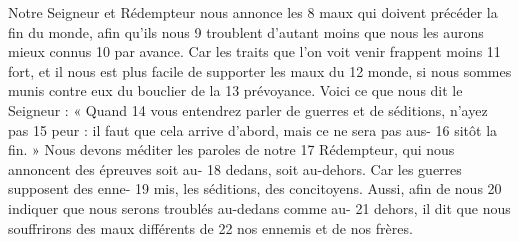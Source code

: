 Notre Seigneur et Rédempteur nous annonce les	 
8	 	maux qui doivent précéder la fin du monde, afin qu'ils nous	 
9	 	troublent d'autant moins que nous les aurons mieux connus	 
10	 	par avance. Car les traits que l'on voit venir frappent moins	 
11	 	fort, et il nous est plus facile de supporter les maux du	 
12	 	monde, si nous sommes munis contre eux du bouclier de la	 
13	 	prévoyance. Voici ce que nous dit le Seigneur : « Quand	 
14	 	vous entendrez parler de guerres et de séditions, n'ayez pas	 
15	 	peur : il faut que cela arrive d'abord, mais ce ne sera pas aus-	 
16	 	sitôt la fin. » Nous devons méditer les paroles de notre	 
17	 	Rédempteur, qui nous annoncent des épreuves soit au-	 
18	 	dedans, soit au-dehors. Car les guerres supposent des enne-	 
19	 	mis, les séditions, des concitoyens. Aussi, afin de nous	 
20	 	indiquer que nous serons troublés au-dedans comme au-	 
21	 	dehors, il dit que nous souffrirons des maux différents de	 
22	 	nos ennemis et de nos frères.
